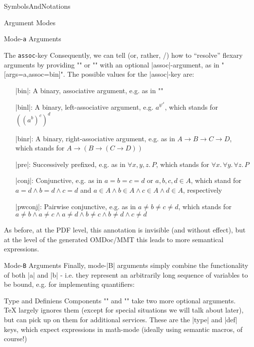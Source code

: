 \begin{smodule}[ns=https://github.com/slatex/sTeX/doc]{SymbolsAndNotations}
\begin{sfragment}{Argument Modes}
\begin{sfragment}{Mode-\texttt a Arguments}
\begin{sfragment}{The \texttt{assoc}-key}
  Consequently, we can tell \sTeX (or, rather, \mmt/\omdoc) how to ``resolve'' flexary
  arguments by providing \stexcode"\symdecl" or \stexcode"\symdef" with an optional
  |assoc|-argument, as in \stexcode"[args=a,assoc=bin]".  The possible
  values for the |assoc|-key are:
  \begin{itemize}
  \item[|bin|:] A binary, associative argument, e.g.  as in \stexcode"\addition"
  \item[|binl|:] A binary, left-associative argument, e.g.
    $a^{\scriptstyle b^{\scriptstyle c^d}}$, which stands for $((a^b)^c)^d$
  \item[|binr|:] A binary, right-associative argument, e.g. as in $A\to B\to C\to D$,
    which stands for $A \to (B \to (C \to D))$
  \item[|pre|:] Successively prefixed, e.g. as in $\forall x,y,z.\,P$, which stands for
    $\forall x.\, \forall y.\, \forall z.\,P$
  \item[|conj|:] Conjunctive, e.g. as in $a=b=c=d$ or $a,b,c,d\in A$, which stand for
    $a=d\wedge b=d\wedge c=d$ and $a\in A\wedge b\in A \wedge c\in A\wedge d\in A$,
    respectively
  \item[|pwconj|:] Pairwise conjunctive, e.g. as in $a\neq b\neq c\neq d$, which stands
    for $a\neq b\wedge a\neq c\wedge a\neq d\wedge b\neq c\wedge b\neq d\wedge c\neq d$
  \end{itemize}
  As before, at the PDF level, this annotation is invisible (and without effect), but at
  the level of the generated OMDoc/MMT this leads to more semantical expressions.
\end{sfragment}
\end{sfragment}
    
\begin{sfragment}{Mode-\texttt B Arguments}
  Finally, mode-|B| arguments simply combine the functionality of both |a| and |b| -
  i.e. they represent an arbitrarily long sequence of variables to be bound, e.g. for
  implementing quantifiers:

\end{sfragment}
\end{sfragment}

\begin{sfragment}{Type and Definiens Components}
  \stexcode"\symdecl" and \stexcode"\symdef" take two more optional arguments. \TeX\xspace
  largely ignores them (except for special situations we will talk about later), but \mmt
  can pick up on them for additional services. These are the |type| and |def| keys, which
  expect expressions in math-mode (ideally using semantic macros, of course!)


\end{sfragment}
\end{smodule}
